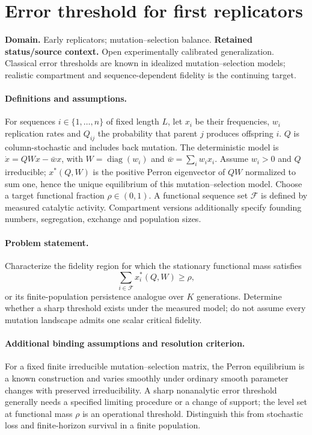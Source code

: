 \documentclass[11pt]{article}
\begin{document}
\section*{Error threshold for first replicators}
\label{prob:286}
\label{rank:313}
\par\smallskip

\noindent\textbf{Domain.} Early replicators; mutation--selection balance. \quad \textbf{Retained status/source context.} Open experimentally calibrated generalization. Classical error thresholds are known in idealized mutation--selection models; realistic compartment and sequence-dependent fidelity is the continuing target.

\paragraph{Definitions and assumptions.} For sequences $i\in\{1,\ldots,n\}$ of fixed length $L$, let $x_i$ be their frequencies, $w_i$ replication rates and $Q_{ij}$ the probability that parent $j$ produces offspring $i$. $Q$ is column-stochastic and includes back mutation. The deterministic model is $\dot x=QWx-\bar w x$, with $W=\operatorname{diag}(w_i)$ and $\bar w=\sum_iw_ix_i$. Assume $w_i>0$ and $Q$ irreducible; $x^*(Q,W)$ is the positive Perron eigenvector of $QW$ normalized to sum one, hence the unique equilibrium of this mutation--selection model. Choose a target functional fraction $\rho\in(0,1)$. A functional sequence set $\mathcal F$ is defined by measured catalytic activity. Compartment versions additionally specify founding numbers, segregation, exchange and population sizes.

\paragraph{Problem statement.} Characterize the fidelity region for which the stationary functional mass satisfies
\[
\sum_{i\in\mathcal F}x_i^*(Q,W)\geq\rho,
\]
or its finite-population persistence analogue over $K$ generations. Determine whether a sharp threshold exists under the measured model; do not assume every mutation landscape admits one scalar critical fidelity.

\paragraph{Additional binding assumptions and resolution criterion.} For a fixed finite irreducible mutation--selection matrix, the Perron equilibrium is a known construction and varies smoothly under ordinary smooth parameter changes with preserved irreducibility. A sharp nonanalytic error threshold generally needs a specified limiting procedure or a change of support; the level set at functional mass $\rho$ is an operational threshold. Distinguish this from stochastic loss and finite-horizon survival in a finite population.
\end{document}
